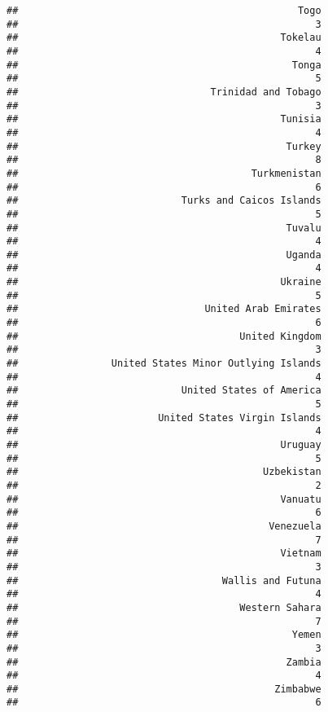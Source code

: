 \documentclass[
]{article}
\begin{document}
\begin{verbatim}
##                                                Togo 
##                                                   3 
##                                             Tokelau 
##                                                   4 
##                                               Tonga 
##                                                   5 
##                                 Trinidad and Tobago 
##                                                   3 
##                                             Tunisia 
##                                                   4 
##                                              Turkey 
##                                                   8 
##                                        Turkmenistan 
##                                                   6 
##                            Turks and Caicos Islands 
##                                                   5 
##                                              Tuvalu 
##                                                   4 
##                                              Uganda 
##                                                   4 
##                                             Ukraine 
##                                                   5 
##                                United Arab Emirates 
##                                                   6 
##                                      United Kingdom 
##                                                   3 
##                United States Minor Outlying Islands 
##                                                   4 
##                            United States of America 
##                                                   5 
##                        United States Virgin Islands 
##                                                   4 
##                                             Uruguay 
##                                                   5 
##                                          Uzbekistan 
##                                                   2 
##                                             Vanuatu 
##                                                   6 
##                                           Venezuela 
##                                                   7 
##                                             Vietnam 
##                                                   3 
##                                   Wallis and Futuna 
##                                                   4 
##                                      Western Sahara 
##                                                   7 
##                                               Yemen 
##                                                   3 
##                                              Zambia 
##                                                   4 
##                                            Zimbabwe 
##                                                   6
\end{verbatim}
\end{document}
